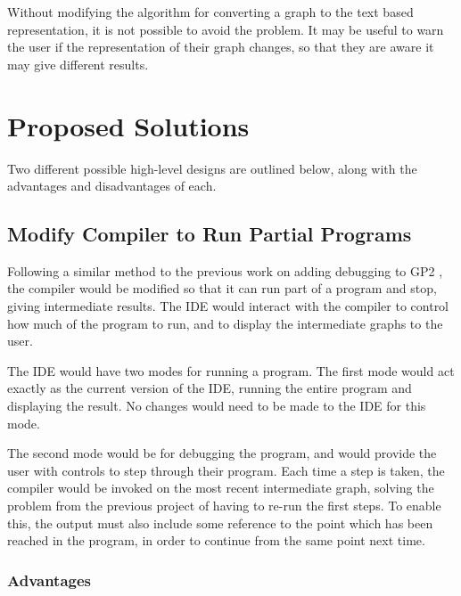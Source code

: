 \documentclass[authoryearcitations]{UoYCSproject}
\begin{document}
Without modifying the algorithm for converting a graph to the text based
representation, it is not possible to avoid the problem. It may be
useful to warn the user if the representation of their graph changes, so that
they are aware it may give different results.


\section{Proposed Solutions}
\label{sec:ProposedSolutions}

Two different possible high-level designs are outlined below, along with the
advantages and disadvantages of each.


\subsection{Modify Compiler to Run Partial Programs}
\label{sec:ProposedDesign1}

Following a similar method to the previous work on adding debugging to GP2
\citep{taylor2016}, the compiler would be modified so that it can run part of a
program and stop, giving intermediate results. The IDE would interact with the
compiler to control how much of the program to run, and to display the
intermediate graphs to the user.

The IDE would have two modes for running a program. The first mode would act
exactly as the current version of the IDE, running the entire program and
displaying the result. No changes would need to be made to the IDE for this mode.

The second mode would be for debugging the program, and would provide the user
with controls to step through their program. Each time a step is taken, the
compiler would be invoked on the most recent intermediate graph, solving the
problem from the previous project of having to re-run the first steps. To
enable this, the output must also include some reference to the point which has
been reached in the program, in order to continue from the same point next time.


\subsubsection{Advantages}
\label{sec:ProposedDesign1Advantages}
\end{document}
